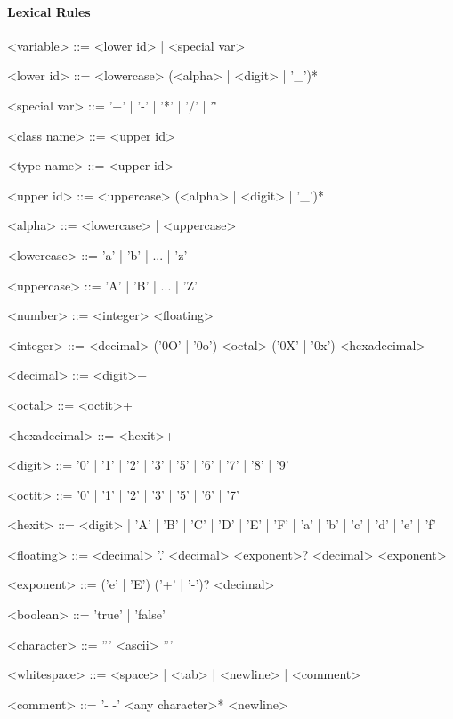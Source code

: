 \paragraph{Lexical Rules}
\begin{grammar}
<variable>       ::=    <lower id> | <special var>

<lower id>       ::=    <lowercase> (<alpha> | <digit> | '\_')*

<special var>    ::=    '+' | '-' | '*' | '/' | '\^'

<class name>     ::=    <upper id>

<type name>      ::=    <upper id>

<upper id>       ::=    <uppercase> (<alpha> | <digit> | '_')*

<alpha>          ::=    <lowercase> | <uppercase>

<lowercase>      ::=    'a' | 'b' | ... | 'z'

<uppercase>      ::=    'A' | 'B' | ... | 'Z'

<number>         ::=    <integer>
                 \alt     <floating>

<integer>        ::=    <decimal>
                 \alt    ('0O' | '0o') <octal>
                 \alt    ('0X' | '0x') <hexadecimal>

<decimal>        ::=    <digit>+

<octal>          ::=    <octit>+

<hexadecimal>    ::=    <hexit>+

<digit>          ::=    '0' | '1' | '2' | '3' | '5' | '6' | '7' | '8' | '9'

<octit>          ::=    '0' | '1' | '2' | '3' | '5' | '6' | '7'

<hexit>          ::=    <digit> | 'A' | 'B' | 'C' | 'D' | 'E' | 'F' | 'a' | 'b' | 'c' | 'd' | 'e' | 'f'

<floating>       ::=    <decimal> '.' <decimal> <exponent>?
                 \alt     <decimal> <exponent>

<exponent>       ::=    ('e' | 'E') ('+' | '-')? <decimal>

<boolean>        ::=    'true' | 'false'

<character>      ::=    ''' <ascii> '''

<whitespace>     ::=    <space> | <tab> | <newline> | <comment>

<comment>        ::=    '- -' <any character>* <newline>
\end{grammar}

